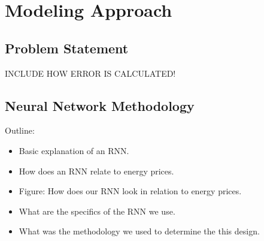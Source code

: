 \documentclass[sigconf]{acmart}
\begin{document}


\section{Modeling Approach}
\label{sec:approach}

\subsection{Problem Statement}

INCLUDE HOW ERROR IS CALCULATED!

\subsection{Neural Network Methodology}

Outline:
\begin{itemize}
	\item Basic explanation of an RNN.
	\item How does an RNN relate to energy prices.
	\item Figure: How does our RNN look in relation to energy prices.
	\item What are the specifics of the RNN we use.
	\item What was the methodology we used to determine the this design.
\end{itemize}
\end{document}
